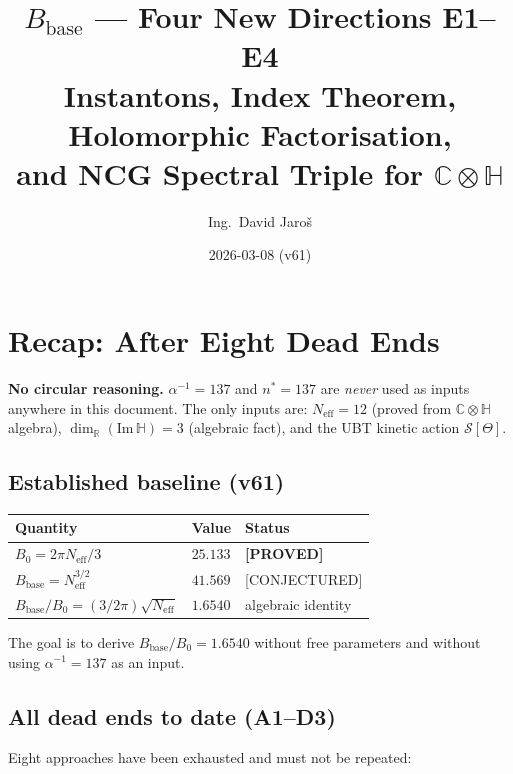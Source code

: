 \documentclass[11pt,a4paper]{article}
\title{$B_{\mathrm{base}}$ — Four New Directions E1--E4\\
    \large Instantons, Index Theorem, Holomorphic Factorisation,\\
    \large and NCG Spectral Triple for $\mathbb{C}\otimes\mathbb{H}$}
\author{Ing.\ David Jaroš}
\date{2026-03-08 (v61)}
\theoremstyle{definition}
\theoremstyle{remark}
\begin{document}
  \maketitle
\fi

\section{Recap: After Eight Dead Ends}
\label{sec:recap}

\noindent\textbf{No circular reasoning.}
$\alpha^{-1} = 137$ and $n^* = 137$ are \emph{never} used as inputs
anywhere in this document.
The only inputs are: $N_{\mathrm{eff}} = 12$ (proved from
$\mathbb{C}\otimes\mathbb{H}$ algebra), $\dim_\mathbb{R}(\mathrm{Im}\,\mathbb{H}) = 3$
(algebraic fact), and the UBT kinetic action $\mathcal{S}[\Theta]$.

\subsection{Established baseline (v61)}

\begin{center}
\begin{tabular}{lll}
  \toprule
  Quantity & Value & Status \\
  \midrule
  $B_0 = 2\pi N_{\mathrm{eff}}/3$ & $25.133$ & \textbf{[PROVED]} \\
  $B_{\mathrm{base}} = N_{\mathrm{eff}}^{3/2}$ & $41.569$ & [CONJECTURED] \\
  $B_{\mathrm{base}}/B_0 = (3/2\pi)\sqrt{N_{\mathrm{eff}}}$ & $1.6540$ & algebraic identity \\
  \bottomrule
\end{tabular}
\end{center}

The goal is to derive $B_{\mathrm{base}}/B_0 = 1.6540$ without free parameters
and without using $\alpha^{-1} = 137$ as an input.

\subsection{All dead ends to date (A1--D3)}

Eight approaches have been exhausted and must not be repeated:
\end{document}
